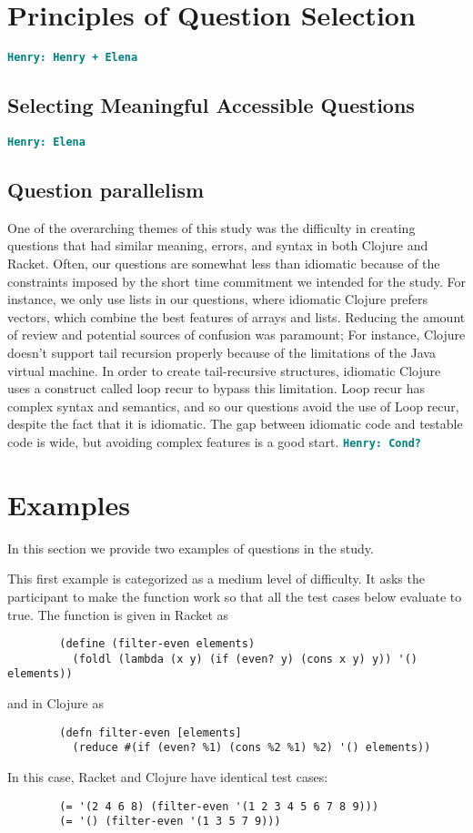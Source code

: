 \documentclass[12pt]{article}
\newcommand{\comment}[1]{{\bf \tt  {#1}}}
\newcommand{\hfcomment}[1]{\textcolor{Teal}{\comment{Henry: {#1}}}}
\begin{document}
\section{Principles of Question Selection}\label{sec:select}
	\hfcomment{Henry + Elena}

	\subsection{Selecting Meaningful Accessible Questions}\label{sec:meaning}
	\hfcomment{Elena}

	\subsection{Question parallelism}\label{sec:parallel}
	
	One of the overarching themes of this study was the difficulty in creating questions that had similar meaning, errors, and syntax in both Clojure and Racket. 
	Often, our questions are somewhat less than idiomatic because of the constraints imposed by the short time commitment we intended for the study.
	For instance, we only use lists in our questions, where idiomatic Clojure prefers vectors, which combine the best features of arrays and lists.
	 Reducing the amount of review and potential sources of confusion was paramount; For instance, Clojure doesn't support tail recursion properly because of the limitations of the Java virtual machine.
	 In order to create tail-recursive structures, idiomatic Clojure uses a construct called loop recur to bypass this limitation.
	 Loop recur has complex syntax and semantics, and so our questions avoid the use of Loop recur, despite the fact that it is idiomatic. 
	 The gap between idiomatic code and testable code is wide, but avoiding complex features is a good start. \hfcomment{Cond?}
\section{Examples}\label{sec:examples}
In this section we provide two examples of questions in the study. 
	
	This first example is categorized as a medium level of difficulty. It asks the participant to make the function work so that all the test cases below evaluate to true.
	The function is given in Racket as 
\begin{verbatim}
		(define (filter-even elements) 
		  (foldl (lambda (x y) (if (even? y) (cons x y) y)) '() elements))
\end{verbatim}
and in Clojure as 
\begin{verbatim}
		(defn filter-even [elements] 
		  (reduce #(if (even? %1) (cons %2 %1) %2) '() elements))
\end{verbatim}
	In this case, Racket and Clojure have identical test cases: 
\begin{verbatim}
		(= '(2 4 6 8) (filter-even '(1 2 3 4 5 6 7 8 9)))
		(= '() (filter-even '(1 3 5 7 9)))
\end{verbatim}
\end{document}

